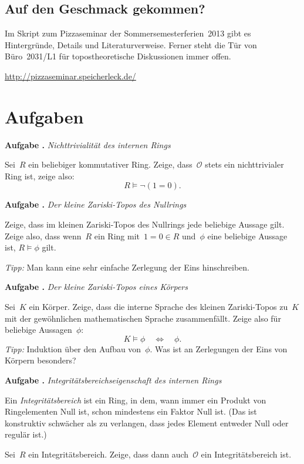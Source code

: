 \documentclass[a4paper,ngerman,12pt]{scrartcl}
\theoremstyle{definition}
\theoremstyle{plain}
\theoremstyle{remark}
\renewcommand{\O}{\mathcal{O}}
\renewcommand{\_}{\mathpunct{.}\,}
\newcommand{\?}{\,{:}\,}
\newlength{\aufgabenskip}
\newcounter{aufgabennummer}
\newenvironment{aufgabe}[1]{
  \addtocounter{aufgabennummer}{1}
  \textbf{Aufgabe \theaufgabennummer{}.} \emph{#1} \par
}{\vspace{\aufgabenskip}}
\begin{document}
\subsection*{Auf den Geschmack gekommen?}

Im Skript zum Pizzaseminar der Sommersemesterferien~2013 gibt es Hintergründe,
Details und Literaturverweise. Ferner steht die Tür von Büro~2031/L1 für
topostheoretische Diskussionen immer offen.
\begin{center}
\url{http://pizzaseminar.speicherleck.de/}
\end{center}


\newpage
\appendix
\section{Aufgaben}

\begin{aufgabe}{Nichttrivialität des internen Rings}
Sei~$R$ ein beliebiger kommutativer Ring. Zeige, dass~$\O$ stets ein
nichttrivialer Ring ist, zeige also:
\[ R \models \neg(1 = 0). \]
\end{aufgabe}
\vspace{-1.5em}

\begin{aufgabe}{Der kleine Zariski-Topos des Nullrings}
Zeige, dass im kleinen Zariski-Topos des Nullrings jede beliebige Aussage gilt.
Zeige also, dass wenn~$R$ ein Ring mit~$1 = 0 \in R$ und~$\phi$ eine beliebige
Aussage ist, $R \models \phi$ gilt.

\emph{Tipp:} Man kann eine sehr einfache Zerlegung der Eins hinschreiben.
\end{aufgabe}

\begin{aufgabe}{Der kleine Zariski-Topos eines Körpers}
Sei~$K$ ein Körper. Zeige, dass die interne Sprache des kleinen Zariski-Topos
zu~$K$ mit der gewöhnlichen mathematischen Sprache zusammenfällt. Zeige also
für beliebige Aussagen~$\phi$:
\[ K \models \phi \quad\Longleftrightarrow\quad \phi. \]
\emph{Tipp:} Induktion über den Aufbau von~$\phi$. Was ist an Zerlegungen der
Eins von Körpern besonders?
\end{aufgabe}

\begin{aufgabe}{Integritätsbereichseigenschaft des internen Rings}
Ein \emph{Integritätsbereich} ist ein Ring, in dem, wann immer ein Produkt von
Ringelementen Null ist, schon mindestens ein Faktor Null ist. (Das ist
konstruktiv schwächer als zu verlangen, dass jedes Element entweder Null oder
regulär ist.)

Sei~$R$ ein Integritätsbereich. Zeige, dass dann auch~$\O$ ein
Integritätsbereich ist.
\end{aufgabe}
\end{document}
